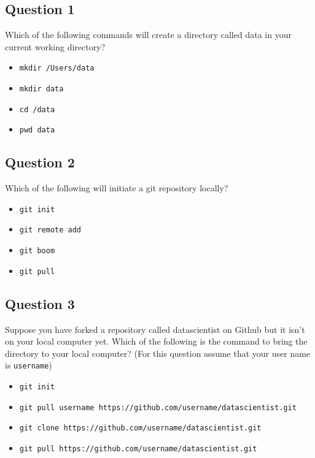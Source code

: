 
\subsection*{Question 1}
Which of the following commands will create a directory called data in your current working directory?
\begin{itemize}
\item \texttt{mkdir /Users/data}
\item \texttt{mkdir data}
\item \texttt{cd /data}
\item \texttt{pwd data}
\end{itemize}
\subsection*{Question 2}
Which of the following will initiate a git repository locally?
\begin{itemize}
\item \texttt{git init}
\item \texttt{git remote add}
\item \texttt{git boom}
\item \texttt{git pull}
\end{itemize}

\subsection*{Question 3}
Suppose you have forked a repository called datascientist on Github but it isn't on your local computer yet. Which of the following is the command to bring the directory to your local computer? (For this question assume that your user name is \texttt{username})

\begin{itemize}
\item \texttt{git init}
\item \texttt{git pull username https://github.com/username/datascientist.git}
\item \texttt{git clone https://github.com/username/datascientist.git}
\item \texttt{git pull https://github.com/username/datascientist.git}
\end{itemize}

